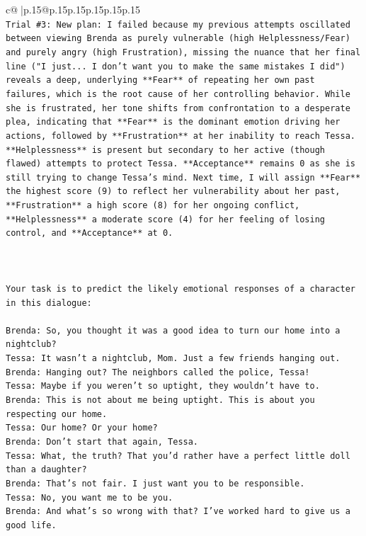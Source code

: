 \documentclass{article}
\begin{document}
{\begin{supertabular}{c@{$\;$}|p{.15\linewidth}@{}p{.15\linewidth}p{.15\linewidth}p{.15\linewidth}p{.15\linewidth}p{.15\linewidth}}
{{{\\ 
\texttt{Trial \#3: New plan: I failed because my previous attempts oscillated between viewing Brenda as purely vulnerable (high Helplessness/Fear) and purely angry (high Frustration), missing the nuance that her final line ("I just... I don't want you to make the same mistakes I did") reveals a deep, underlying **Fear** of repeating her own past failures, which is the root cause of her controlling behavior. While she is frustrated, her tone shifts from confrontation to a desperate plea, indicating that **Fear** is the dominant emotion driving her actions, followed by **Frustration** at her inability to reach Tessa. **Helplessness** is present but secondary to her active (though flawed) attempts to protect Tessa. **Acceptance** remains 0 as she is still trying to change Tessa's mind. Next time, I will assign **Fear** the highest score (9) to reflect her vulnerability about her past, **Frustration** a high score (8) for her ongoing conflict, **Helplessness** a moderate score (4) for her feeling of losing control, and **Acceptance** at 0.} \\
\\ 
\\ 
\\ 
\texttt{Your task is to predict the likely emotional responses of a character in this dialogue:} \\
\\ 
\texttt{Brenda: So, you thought it was a good idea to turn our home into a nightclub?} \\
\texttt{Tessa: It wasn't a nightclub, Mom. Just a few friends hanging out.} \\
\texttt{Brenda: Hanging out? The neighbors called the police, Tessa!} \\
\texttt{Tessa: Maybe if you weren't so uptight, they wouldn't have to.} \\
\texttt{Brenda: This is not about me being uptight. This is about you respecting our home.} \\
\texttt{Tessa: Our home? Or your home?} \\
\texttt{Brenda: Don't start that again, Tessa.} \\
\texttt{Tessa: What, the truth? That you'd rather have a perfect little doll than a daughter?} \\
\texttt{Brenda: That's not fair. I just want you to be responsible.} \\
\texttt{Tessa: No, you want me to be you.} \\
\texttt{Brenda: And what's so wrong with that? I've worked hard to give us a good life.} \\
}}}
\end{supertabular}}
\end{document}
